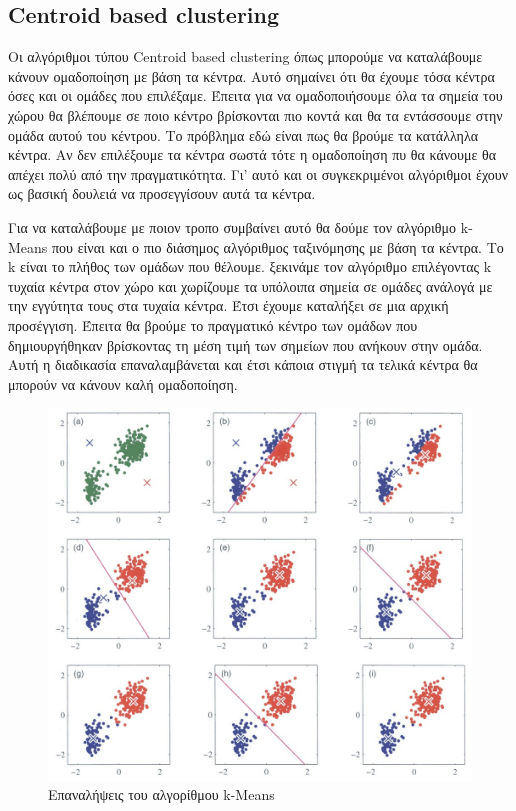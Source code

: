 \subsection{\textlatin{Centroid based clustering}}
Οι αλγόριθμοι τύπου \textlatin{Centroid based clustering} όπως μπορούμε να καταλάβουμε κάνουν ομαδοποίηση με βάση τα κέντρα. Αυτό σημαίνει ότι θα έχουμε τόσα κέντρα όσες και οι ομάδες που επιλέξαμε.
Έπειτα για να ομαδοποιήσουμε όλα τα σημεία του χώρου θα βλέπουμε σε ποιο κέντρο βρίσκονται πιο κοντά και θα τα εντάσσουμε στην ομάδα αυτού του κέντρου. Το πρόβλημα εδώ είναι πως θα βρούμε τα
κατάλληλα κέντρα. Αν δεν επιλέξουμε τα κέντρα σωστά τότε η ομαδοποίηση πυ θα κάνουμε θα απέχει πολύ από την πραγματικότητα. Γι' αυτό και οι συγκεκριμένοι αλγόριθμοι έχουν ως βασική δουλειά να
προσεγγίσουν αυτά τα κέντρα.\par Για να καταλάβουμε με ποιον τροπο συμβαίνει αυτό θα δούμε τον αλγόριθμο \textlatin{k-Means} που είναι και ο πιο διάσημος αλγόριθμος ταξινόμησης με βάση τα κέντρα.
Το \textlatin{k} είναι το πλήθος των ομάδων που θέλουμε. ξεκινάμε τον αλγόριθμο επιλέγοντας \textlatin{k} τυχαία κέντρα στον χώρο και χωρίζουμε τα υπόλοιπα σημεία σε ομάδες ανάλογά με την εγγύτητα
τους στα τυχαία κέντρα. Έτσι έχουμε καταλήξει σε μια αρχική προσέγγιση. Έπειτα θα βρούμε το πραγματικό κέντρο των ομάδων που δημιουργήθηκαν βρίσκοντας τη μέση τιμή των σημείων που ανήκουν στην
ομάδα. Αυτή η διαδικασία επαναλαμβάνεται και έτσι κάποια στιγμή τα τελικά κέντρα θα μπορούν να κάνουν καλή ομαδοποίηση.
\begin{figure}[H]
    \centering
    \includegraphics[width=1\textwidth]{images/kmeans.jpg}
    \caption{Επαναλήψεις του αλγορίθμου \textlatin{k-Means}}
\end{figure}
